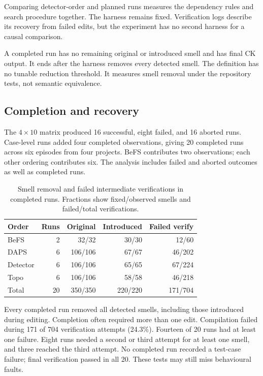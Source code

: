 \documentclass[conference]{IEEEtran}
\begin{document}
Comparing detector-order and planned runs measures the dependency rules and
search procedure together. The harness remains fixed. Verification logs
describe its recovery from failed edits, but the experiment has no second
harness for a causal comparison.

A completed run has no remaining original or introduced smell and has final CK
output. It ends after the harness removes every detected smell. The definition
has no tunable reduction threshold. It measures smell removal under the
repository tests, not semantic equivalence.

\subsection{Completion and recovery}

The $4\times10$ matrix produced 16 successful, eight failed, and 16 aborted
runs. Case-level runs added four completed observations, giving 20 completed
runs across six episodes from four projects. BeFS contributes two observations;
each other ordering contributes six. The analysis includes failed and aborted
outcomes as well as completed runs.

\begin{table}[tb]
\centering
\footnotesize
\setlength{\tabcolsep}{3.0pt}
\begin{tabular}{@{}lrrrr@{}}
\toprule
Order & Runs & Original & Introduced & Failed verify \\
\midrule
BeFS   & 2 & 32/32  & 30/30 & 12/60 \\
DAPS   & 6 & 106/106 & 67/67 & 46/202 \\
Detector & 6 & 106/106 & 65/65 & 67/224 \\
Topo   & 6 & 106/106 & 58/58 & 46/218 \\
\midrule
Total  & 20 & 350/350 & 220/220 & 171/704 \\
\bottomrule
\end{tabular}
\caption{Smell removal and failed intermediate verifications in completed
runs. Fractions show fixed/observed smells and failed/total
verifications.}
\label{tab:completion}
\end{table}

Every completed run removed all detected smells, including those introduced
during editing. Completion often required more than one edit. Compilation
failed during 171 of 704 verification attempts (24.3\%).
Fourteen of 20 runs had at least one failure. Eight runs needed a second or
third attempt for at least one smell, and three reached the third attempt. No
completed run recorded a test-case failure; final verification passed in all
20. These tests may still miss behavioural faults.
\end{document}
